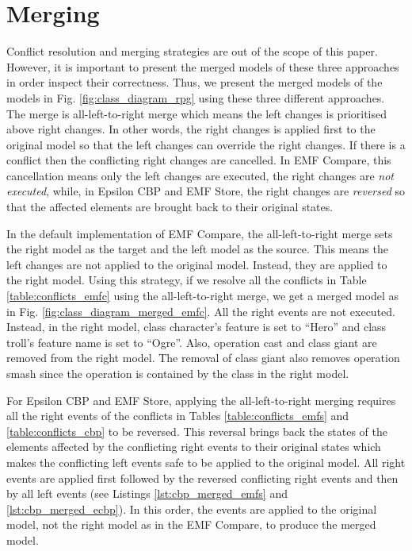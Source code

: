 \section{Merging}
\label{sec:merging}
Conflict resolution and merging strategies are out of the scope of this paper. However, it is important to present the merged models of these three approaches in order inspect their correctness. Thus, we present the merged models of the models in Fig. \ref{fig:class_diagram_rpg} using these three different approaches. The merge is all-left-to-right merge which means the left changes is prioritised above right changes. In other words, the right changes is applied first to the original model so that the left changes can override the right changes. If there is a conflict then the conflicting right changes are cancelled. In EMF Compare, this cancellation means only the left changes are executed, the right changes are \emph{not executed}, while, in Epsilon CBP and EMF Store, the right changes are \emph{reversed} so that the affected elements are brought back to their original states.    

In the default implementation of EMF Compare, the all-left-to-right merge sets the right model as the target and the left model as the source. This means the left changes are not applied to the original model. Instead, they are applied to the right model. Using this strategy, if we resolve all the conflicts in Table \ref{table:conflicts_emfc} using the all-left-to-right merge, we get a merged model as in Fig. \ref{fig:class_diagram_merged_emfc}. All the right events are not executed. Instead, in the right model, class \textsf{character}'s feature  is set to ``Hero'' and class \textsf{troll}'s feature \textsf{name} is set to ``Ogre''. Also, operation \textsf{cast} and class \textsf{giant} are removed from the right model. The removal of class \textsf{giant} also removes operation \textsf{smash} since the operation is contained by the class in the right model. 

For Epsilon CBP and EMF Store, applying the all-left-to-right merging requires all the right events of the conflicts in Tables \ref{table:conflicts_emfs} and \ref{table:conflicts_cbp} to be reversed. This reversal brings back the states of the elements affected by the conflicting right events to their original states which makes the conflicting left events safe to be applied to the original model. All right events are applied first followed by the reversed conflicting right events and then by all left events (see Listings \ref{lst:cbp_merged_emfs} and \ref{lst:cbp_merged_ecbp}). In this order, the events are applied to the original model, not the right model as in the EMF Compare, to produce the merged model.

